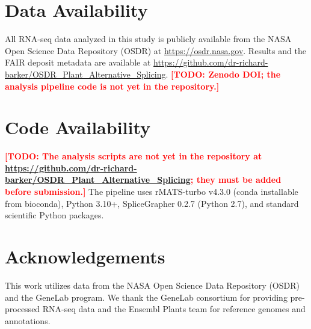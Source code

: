 \documentclass[12pt,a4paper]{article}
\newcommand{\TODO}[1]{\textcolor{red}{\textbf{[TODO: #1]}}}
\begin{document}
\section{Data Availability}

All RNA-seq data analyzed in this study is publicly available from the NASA Open Science Data Repository (OSDR) at \url{https://osdr.nasa.gov}. Results and the FAIR deposit metadata are available at \url{https://github.com/dr-richard-barker/OSDR_Plant_Alternative_Splicing}. \TODO{Zenodo DOI; the analysis pipeline code is not yet in the repository.}

\section{Code Availability}

\TODO{The analysis scripts are not yet in the repository at \url{https://github.com/dr-richard-barker/OSDR_Plant_Alternative_Splicing}; they must be added before submission.} The pipeline uses rMATS-turbo v4.3.0 (conda installable from bioconda), Python 3.10+, SpliceGrapher 0.2.7 (Python 2.7), and standard scientific Python packages.

\section{Acknowledgements}

This work utilizes data from the NASA Open Science Data Repository (OSDR) and the GeneLab program. We thank the GeneLab consortium for providing pre-processed RNA-seq data and the Ensembl Plants team for reference genomes and annotations.
\end{document}
